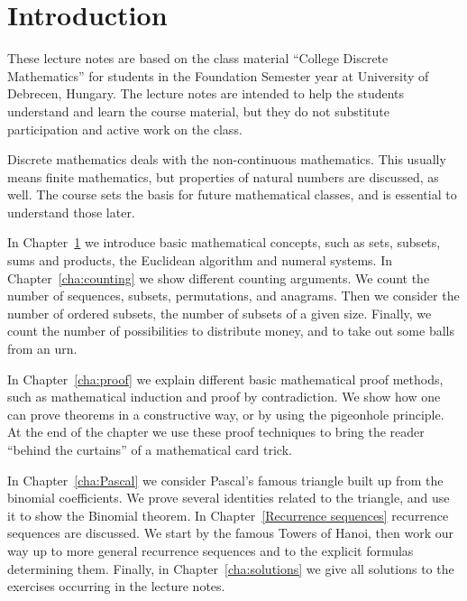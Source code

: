 
\chapter{Introduction}\label{cha:intro}





These lecture notes are based on the class material ``College Discrete Mathematics'' for students in the Foundation Semester year at University of Debrecen, Hungary. 
The lecture notes are intended to help the students understand and learn the course material, 
but they do not substitute participation and active work on the class. 

Discrete mathematics deals with the non-continuous mathematics.
This usually means finite mathematics, 
but properties of natural numbers are discussed, as well. 
The course sets the basis for future mathematical classes, 
and is essential to understand those later. 

In Chapter~\ref{cha:intro} we introduce basic mathematical concepts, 
such as sets, subsets, 
sums and products, 
the Euclidean algorithm and numeral systems. 
In Chapter~\ref{cha:counting} we show different counting arguments. 
We count the number of sequences, 
subsets, permutations, and anagrams. 
Then we consider the number of ordered subsets, 
the number of subsets of a given size. 
Finally, we count the number of possibilities to distribute money, 
and to take out some balls from an urn. 

In Chapter~\ref{cha:proof} we explain different basic mathematical proof methods, 
such as mathematical induction and
proof by contradiction. 
We show how one can prove theorems in a constructive way, 
or by using the pigeonhole principle. 
At the end of the chapter we use these proof techniques to bring the reader ``behind the curtains'' of a mathematical card trick. 

In Chapter~\ref{cha:Pascal} we consider Pascal's famous triangle built up from the binomial coefficients. 
We prove several identities related to the triangle, 
and use it to show the Binomial theorem. 
In Chapter~\ref{Recurrence sequences} recurrence sequences are discussed. 
We start by the famous Towers of Hanoi, 
then work our way up to more general recurrence sequences and to the explicit formulas determining them. 
Finally, in Chapter~\ref{cha:solutions} we give all solutions to the exercises occurring in the lecture notes. 


